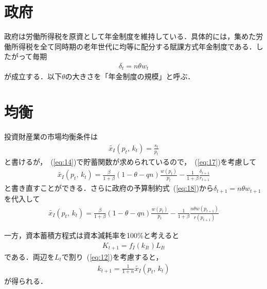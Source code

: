 \documentclass[12pt,a4paper]{jsarticle}
\begin{document}
\section{政府}
政府は労働所得税を原資として年金制度を維持している．具体的には，集めた労働所得税を全て同時期の老年世代に均等に配分する賦課方式年金制度である．したがって毎期
\begin{align}
 \delta_{t} = n \theta w_{t} \label{eq:18}
\end{align}
が成立する．以下$\theta$の大きさを「年金制度の規模」と呼ぶ．
\section{均衡}
%
%
%

投資財産業の市場均衡条件は
\begin{align}
 \tilde{x_{I}}(p_{t}, \, k_{t}) = \frac{s_{t}}{p_{t}}
\end{align}
と書けるが，~(\ref{eq:14})で貯蓄関数が求められているので，~(\ref{eq:17})を考慮して
\begin{align}
\tilde{x_{I}}(p_{t}, \, k_{t})=\frac{\beta}{1+\beta}(1-\theta-qn)\frac{w(p_{t})}{p_{t}} - \frac{1}{1+\beta}\frac{\delta_{t+1}}{r_{t+1}}
\end{align}
と書き直すことができる．さらに政府の予算制約式~(\ref{eq:18})から$\delta_{t+1} = n \theta w_{t+1}$を代入して
\begin{align}
 \tilde{x_{I}}(p_{t}, \, k_{t})  = \frac{\beta}{1+\beta}(1-\theta-qn)\frac{w(p_{t})}{p_{t}} - \frac{1}{1+\beta}\frac{ n \theta w(p_{t+1})}{r(p_{t+1})} \label{eq:5}
\end{align}

一方，資本蓄積方程式は資本減耗率を100$\%$と考えると
\begin{align}
 K_{t+1} =  f_{I}(k_{It}) L_{It}
\end{align} 
である．両辺を$L_{t}$で割り~(\ref{eq:12})を考慮すると，
\begin{align}
 k_{t+1} = \frac{1}{1+n}\tilde{x_{I}}(p_{t}, \, k_{t}) \label{eq:6}
\end{align}
が得られる．
\end{document}
